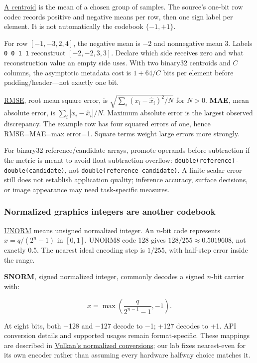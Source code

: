 \hyperref[appendix-4ccd7a775813]{A centroid} is the mean of a chosen group of samples. The source's one-bit row codec records positive and negative means per row, then one sign label per element. It is not automatically the codebook \(\{-1,+1\}\).

For row \([-1,-3,2,4]\), the negative mean is −2 and nonnegative mean 3. Labels \texttt{0\ 0\ 1\ 1} reconstruct \([-2,-2,3,3]\). Declare which side receives zero and what reconstruction value an empty side uses. With two binary32 centroids and \(C\) columns, the asymptotic metadata cost is \(1+64/C\) bits per element before padding/header---not exactly one bit.

\hyperref[appendix-537171d69d27]{RMSE}, root mean square error, is \(\sqrt{\sum_i(x_i-\widehat x_i)^2/N}\) for \(N>0\). \textbf{MAE}, mean absolute error, is \(\sum_i|x_i-\widehat x_i|/N\). Maximum absolute error is the largest observed discrepancy. The example row has four squared errors of one, hence RMSE=MAE=max error=1. Square terms weight large errors more strongly.

For binary32 reference/candidate arrays, promote operands before subtraction if the metric is meant to avoid float subtraction overflow: \texttt{double(reference)-double(candidate)}, not \texttt{double(reference-candidate)}. A finite scalar error still does not establish application quality; inference accuracy, surface decisions, or image appearance may need task-specific measures.

\subsubsection{Normalized graphics integers are another codebook}\label{01-foundations-i-ch001-normalized-graphics-integers-are-another-codebook}

\hypertarget{01-foundations-i-ch001-normalized-graphics-integers-are-another-codebook}{}

\hyperref[appendix-b2402c453dac]{UNORM} means unsigned normalized integer. An \(n\)-bit code represents \(x=q/(2^n-1)\) in \([0,1]\). UNORM8 code 128 gives \(128/255\approx0.5019608\), not exactly 0.5. The nearest ideal encoding step is \(1/255\), with half-step error inside the range.

\textbf{SNORM}, signed normalized integer, commonly decodes a signed \(n\)-bit carrier with:

\[
x=\max\!\left(\frac{q}{2^{n-1}-1},-1\right).
\]

At eight bits, both −128 and −127 decode to −1; +127 decodes to +1. API conversion details and supported usages remain format-specific. These mappings are described in \href{https://docs.vulkan.org/spec/latest/chapters/fundamentals.html\#fundamentals-fixedfpconv}{Vulkan's normalized conversions}; our lab fixes nearest-even for its own encoder rather than assuming every hardware halfway choice matches it.

